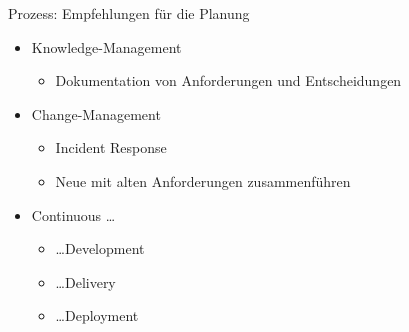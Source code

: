 \begin{frame}{Prozess: Empfehlungen für die Planung}
  \begin{itemize}
    
    \item Knowledge-Management
    \begin{itemize}
      \item Dokumentation von Anforderungen und Entscheidungen
    \end{itemize}

    \item Change-Management %
    \begin{itemize}
      \item Incident Response
      \item Neue mit alten Anforderungen zusammenführen
    \end{itemize}
    
    \item Continuous \ldots
    \begin{itemize}
      \item \dots Development
      \item \dots Delivery
      \item \dots Deployment
    \end{itemize}

  \end{itemize}
\end{frame}


